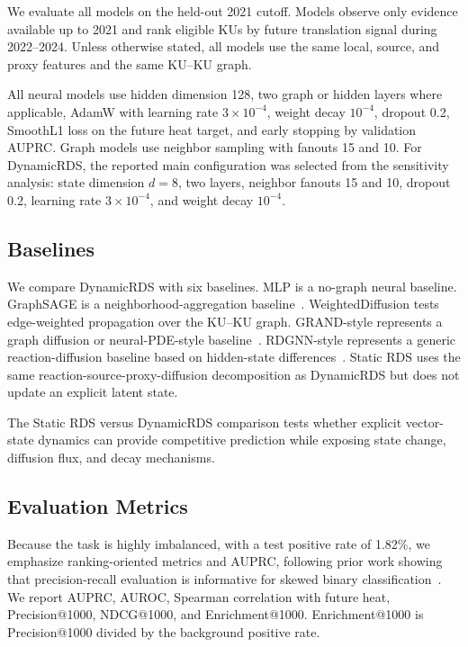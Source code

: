 \documentclass[conference]{IEEEtran}
\begin{document}
We evaluate all models on the held-out 2021 cutoff. Models observe only evidence available up to 2021 and rank eligible KUs by future translation signal during 2022--2024. Unless otherwise stated, all models use the same local, source, and proxy features and the same KU--KU graph.

All neural models use hidden dimension 128, two graph or hidden layers where applicable, AdamW with learning rate $3\times10^{-4}$, weight decay $10^{-4}$, dropout 0.2, SmoothL1 loss on the future heat target, and early stopping by validation AUPRC. Graph models use neighbor sampling with fanouts 15 and 10. For DynamicRDS, the reported main configuration was selected from the sensitivity analysis: state dimension $d=8$, two layers, neighbor fanouts 15 and 10, dropout 0.2, learning rate $3\times10^{-4}$, and weight decay $10^{-4}$.

\subsection{Baselines}

We compare DynamicRDS with six baselines. MLP is a no-graph neural baseline. GraphSAGE is a neighborhood-aggregation baseline~\cite{hamilton2017graphsage}. WeightedDiffusion tests edge-weighted propagation over the KU--KU graph. GRAND-style represents a graph diffusion or neural-PDE-style baseline~\cite{chamberlain2021grand}. RDGNN-style represents a generic reaction-diffusion baseline based on hidden-state differences~\cite{eliasof2024graph}. Static RDS uses the same reaction-source-proxy-diffusion decomposition as DynamicRDS but does not update an explicit latent state.

The Static RDS versus DynamicRDS comparison tests whether explicit vector-state dynamics can provide competitive prediction while exposing state change, diffusion flux, and decay mechanisms.

\subsection{Evaluation Metrics}

Because the task is highly imbalanced, with a test positive rate of 1.82\%, we emphasize ranking-oriented metrics and AUPRC, following prior work showing that precision-recall evaluation is informative for skewed binary classification~\cite{saito2015precision}. We report AUPRC, AUROC, Spearman correlation with future heat, Precision@1000, NDCG@1000, and Enrichment@1000. Enrichment@1000 is Precision@1000 divided by the background positive rate.
\end{document}
